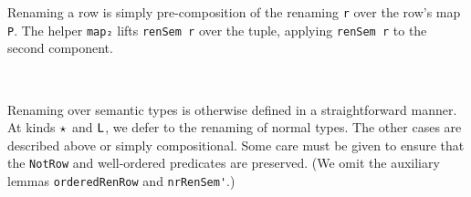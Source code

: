 \documentclass[authoryear, acmsmall, screen, review, nonacm]{acmart} %
\begin{document}
Renaming a row is simply pre-composition of the renaming \verb!r! over the row's map \verb!P!. The helper \verb!map₂! lifts \verb!renSem r! over the tuple, applying \verb!renSem r! to the second component. 

\begin{code}%
\>[0]\AgdaSpace{}%
\AgdaSymbol{:}\AgdaSpace{}%
\AgdaSpace{}%
\AgdaSpace{}%
\AgdaSpace{}%
\AgdaSpace{}%
\AgdaSpace{}%
\AgdaSymbol{(}\AgdaSpace{}%
\AgdaSpace{}%
\AgdaSymbol{)}\AgdaSpace{}%
\AgdaSpace{}%
\AgdaSpace{}%
\AgdaSymbol{(}\AgdaSpace{}%
\AgdaSpace{}%
\AgdaSymbol{)}\<%
\\
\>[0]\AgdaSpace{}%
\AgdaSpace{}%
\AgdaSymbol{(}\AgdaSpace{}%
\AgdaOperator{\AgdaInductiveConstructor{,}}\AgdaSpace{}%
\AgdaSymbol{)}\AgdaSpace{}%
\AgdaSymbol{=}\AgdaSpace{}%
\AgdaSpace{}%
\AgdaOperator{\AgdaInductiveConstructor{,}}\AgdaSpace{}%
\AgdaSpace{}%
\AgdaSymbol{(}\AgdaSpace{}%
\AgdaSymbol{)}\AgdaSpace{}%
\AgdaSpace{}%
\<%
\end{code}

Renaming over semantic types is otherwise defined in a straightforward manner. At kinds $\star_{}$ and $\mathsf{L}$, we defer to the renaming of normal types. The other cases are described above or simply compositional. Some care must be given to ensure that the \verb!NotRow! and well-ordered predicates are preserved. (We omit the auxiliary lemmas \verb!orderedRenRow! and \verb!nrRenSem'!.)
\end{document}
